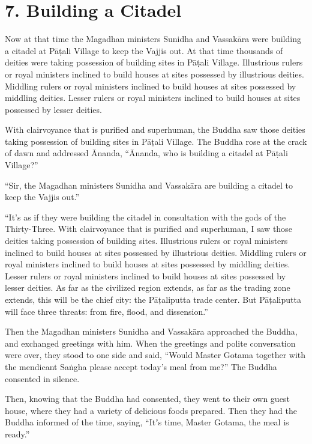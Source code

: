 \documentclass[12pt,openany]{book}%
\begin{document}
\section*{7. Building a Citadel }

Now at that time the Magadhan ministers Sunidha and \textsanskrit{Vassakāra} were building a citadel at \textsanskrit{Pāṭali} Village to keep the Vajjis out. At that time thousands of deities were taking possession of building sites in \textsanskrit{Pāṭali} Village. Illustrious rulers or royal ministers inclined to build houses at sites possessed by illustrious deities. Middling rulers or royal ministers inclined to build houses at sites possessed by middling deities. Lesser rulers or royal ministers inclined to build houses at sites possessed by lesser deities. 

With clairvoyance that is purified and superhuman, the Buddha saw those deities taking possession of building sites in \textsanskrit{Pāṭali} Village. The Buddha rose at the crack of dawn and addressed Ānanda, “Ānanda, who is building a citadel at \textsanskrit{Pāṭali} Village?” 

“Sir, the Magadhan ministers Sunidha and \textsanskrit{Vassakāra} are building a citadel to keep the Vajjis out.” 

“It’s as if they were building the citadel in consultation with the gods of the Thirty-Three. With clairvoyance that is purified and superhuman, I saw those deities taking possession of building sites. Illustrious rulers or royal ministers inclined to build houses at sites possessed by illustrious deities. Middling rulers or royal ministers inclined to build houses at sites possessed by middling deities. Lesser rulers or royal ministers inclined to build houses at sites possessed by lesser deities. As far as the civilized region extends, as far as the trading zone extends, this will be the chief city: the \textsanskrit{Pāṭaliputta} trade center. But \textsanskrit{Pāṭaliputta} will face three threats: from fire, flood, and dissension.” 

Then the Magadhan ministers Sunidha and \textsanskrit{Vassakāra} approached the Buddha, and exchanged greetings with him. When the greetings and polite conversation were over, they stood to one side and said, “Would Master Gotama together with the mendicant \textsanskrit{Saṅgha} please accept today’s meal from me?” The Buddha consented in silence. 

Then, knowing that the Buddha had consented, they went to their own guest house, where they had a variety of delicious foods prepared. Then they had the Buddha informed of the time, saying, “Itʼs time, Master Gotama, the meal is ready.” 
\end{document}
